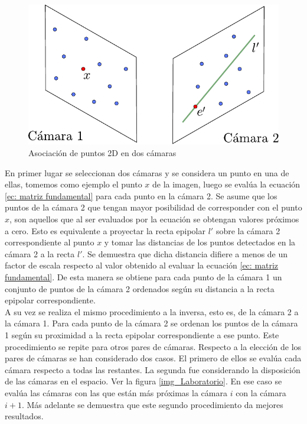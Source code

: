 \begin{figure}[H]
\begin{center}
\includegraphics[scale=0.7]{img/Reconstruccion/cam2cam.pdf}
\end{center}
\caption{Asociación de puntos 2D en dos cámaras}
\label{fig: cam2cam }
\end{figure}

En primer lugar se seleccionan dos cámaras y se considera un punto en una de ellas, tomemos como ejemplo el punto $x$ de la imagen, luego se evalúa la ecuación \ref{ec: matriz fundamental} para cada punto en la cámara 2. Se asume que los puntos de la cámara 2 que tengan mayor posibilidad de corresponder con el punto $x$, son aquellos que al ser evaluados por la ecuación se obtengan valores próximos a cero. Esto es equivalente a proyectar la recta epipolar $l'$ sobre la cámara 2 correspondiente al punto $x$ y tomar las distancias de los puntos detectados en la cámara 2 a la recta $l'$. Se demuestra que dicha distancia difiere a menos de un factor de escala respecto al valor obtenido al evaluar la ecuación \ref{ec: matriz fundamental}. De esta manera se obtiene para cada punto de la cámara 1 un conjunto de puntos de la cámara 2 ordenados según su distancia a la recta epipolar correspondiente.\\

A su vez se realiza el mismo procedimiento a la inversa, esto es, de la cámara 2 a la cámara 1. Para cada punto de la cámara 2 se ordenan los puntos de la cámara 1 según su proximidad a la recta epipolar correspondiente a ese punto. Este procedimiento se repite para otros pares de cámaras. Respecto a la elección de los pares de cámaras se han considerado dos casos. El primero de ellos se evalúa cada cámara respecto a todas las restantes. La segunda fue considerando la disposición de las cámaras en el espacio. Ver la figura \ref{img_Laboratorio}. En ese caso se evalúa las cámaras con las que están más próximas la cámara $i$ con la cámara $i+1$. Más adelante se demuestra que este segundo procedimiento da mejores resultados. \\

